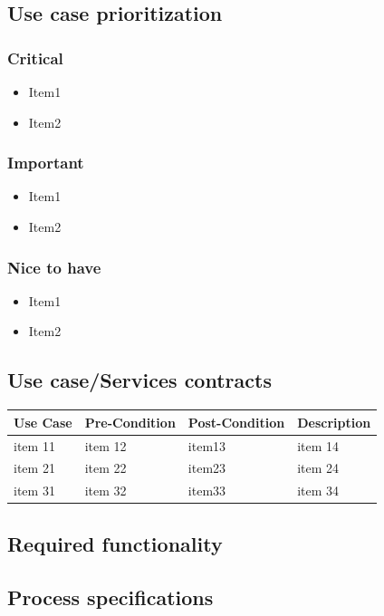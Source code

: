 \documentclass[a4paper,10pt]{article}
\begin{document}
\subsection{Use case prioritization}
\subsubsection{Critical}
\begin{itemize}
\item Item1
\item Item2
\end{itemize}

\subsubsection{Important}
\begin{itemize}
\item Item1
\item Item2
\end{itemize}

\subsubsection{Nice to have}
\begin{itemize}
\item Item1
\item Item2
\end{itemize}

\subsection{Use case/Services contracts}
\begin{tabu} to \textwidth { | X[l] | X[l] | X[l] | X[l] | }
	\hline
		Use Case		& Pre-Condition		& Post-Condition		& Description	\\ \hline \hline
		item 11		& item 12			& item13				& item 14  \\ \hline
		item 21		& item 22			& item23				& item 24  \\ \hline
		item 31		& item 32			& item33				& item 34  \\
	\hline
\end{tabu}

\subsection{Required functionality}

\subsection{Process specifications}
\end{document}

